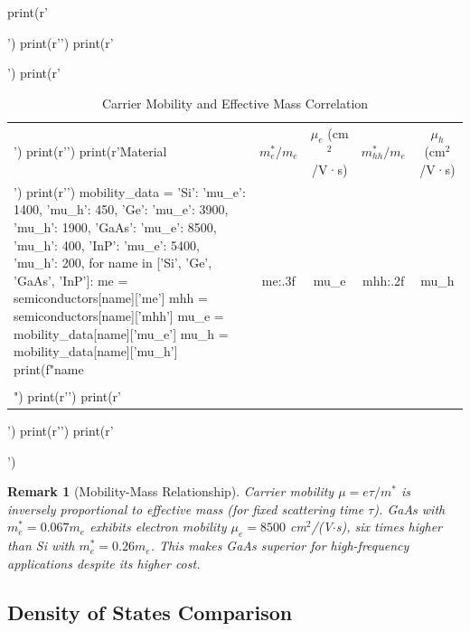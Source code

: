 \documentclass[11pt,a4paper]{article}
\newtheorem{remark}{Remark}[section]
\begin{document}
\begin{pycode}
print(r'\begin{table}[H]')
print(r'\centering')
print(r'\caption{Carrier Mobility and Effective Mass Correlation}')
print(r'\begin{tabular}{@{}lcccc@{}}')
print(r'\toprule')
print(r'Material & $m_e^*/m_e$ & $\mu_e$ (cm$^2$/V·s) & $m_{hh}^*/m_e$ & $\mu_h$ (cm$^2$/V·s) \\')
print(r'\midrule')
mobility_data = {
    'Si': {'mu_e': 1400, 'mu_h': 450},
    'Ge': {'mu_e': 3900, 'mu_h': 1900},
    'GaAs': {'mu_e': 8500, 'mu_h': 400},
    'InP': {'mu_e': 5400, 'mu_h': 200},
}
for name in ['Si', 'Ge', 'GaAs', 'InP']:
    me = semiconductors[name]['me']
    mhh = semiconductors[name]['mhh']
    mu_e = mobility_data[name]['mu_e']
    mu_h = mobility_data[name]['mu_h']
    print(f"{name} & {me:.3f} & {mu_e} & {mhh:.2f} & {mu_h} \\\\")
print(r'\bottomrule')
print(r'\end{tabular}')
print(r'\label{tab:mobility}')
print(r'\end{table}')
\end{pycode}

\begin{remark}[Mobility-Mass Relationship]
Carrier mobility $\mu = e\tau/m^*$ is inversely proportional to effective mass (for fixed
scattering time $\tau$). GaAs with $m_e^* = 0.067 m_e$ exhibits electron mobility
$\mu_e = 8500$ cm$^2$/(V$\cdot$s), six times higher than Si with $m_e^* = 0.26 m_e$.
This makes GaAs superior for high-frequency applications despite its higher cost.
\end{remark}

\subsection{Density of States Comparison}
\end{document}
